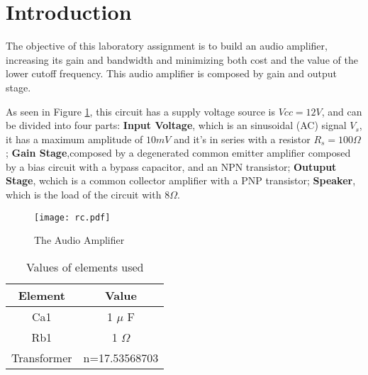 \section{Introduction}
\label{sec:introduction}

The objective of this laboratory assignment is to build an audio amplifier, increasing its gain and bandwidth and minimizing both cost and the value of the lower cutoff frequency. This audio amplifier is composed by gain and output stage.

As seen in Figure \ref{fig:rc}, this circuit has a supply voltage source is $Vcc=12 V$, and can be divided into four parts: \textbf{Input Voltage}, which is an sinusoidal (AC) signal $V_s$, it has a maximum amplitude of $10 mV$ and it's in series with a resistor $R_s=100 \Omega$; \textbf{Gain Stage},composed by a degenerated common emitter amplifier composed by a bias circuit with a bypass capacitor, and an NPN transistor; \textbf{Outuput Stage}, wchich is a common collector amplifier with a PNP transistor; \textbf{Speaker}, which is the load of the circuit with $8 \Omega$.


\begin{figure}[h] \centering
\texttt{[image: rc.pdf]}
\vspace{-5mm}
\caption{The Audio Amplifier}
\label{fig:rc}
\end{figure}


\begin{table}[h]
  \centering
  \begin{tabular}{|c|c|}
    \hline    
    Element &  Value \\ \hline
    Ca1 & 1 $\mu$ F \\ \hline
    Rb1 & 1 $\Omega$ \\ \hline
    Transformer & n=17.53568703 \\ \hline
    
 \end{tabular}
 \caption{Values of elements used}
  \label{tab:op2}
\end{table}






